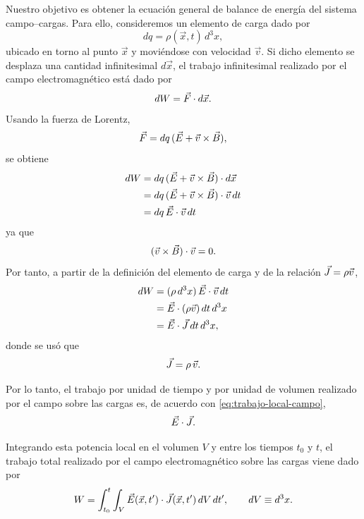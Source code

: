 \documentclass[../main.tex]{subfiles}
\begin{document}
Nuestro objetivo es obtener la ecuación general de balance de energía del sistema campo--cargas. Para ello, consideremos un elemento de carga dado por
\begin{equation*}
    dq=\rho(\vec x,t)\,d^3x,
\end{equation*}
ubicado en torno al punto $\vec x$ y moviéndose con velocidad $\vec v$. Si dicho elemento se desplaza una cantidad infinitesimal $d\vec x$, el trabajo infinitesimal realizado por el campo electromagnético está dado por
\begin{equation*}
    dW=\vec{F}\cdot d\vec x.
\end{equation*}
Usando la fuerza de Lorentz,
\begin{equation*}
    \vec{F}=dq\,(\vec{E}+\vec v\times\vec{B}),
\end{equation*}
se obtiene
\begin{align*}
    dW
    &=dq\,(\vec{E}+\vec v\times\vec{B})\cdot d\vec x \notag\\
    &=dq\,(\vec{E}+\vec v\times\vec{B})\cdot \vec v\,dt \notag\\
    &=dq\,\vec{E}\cdot \vec v\,dt
\end{align*}
ya que
\begin{equation*}
    (\vec v\times\vec{B})\cdot \vec v=0.
\end{equation*}
Por tanto, a partir de la definición del elemento de carga y de la relación $\vec{J}=\rho\vec v$,
\begin{align}
    dW
    &= (\rho\,d^3x)\,\vec{E}\cdot\vec v\,dt \notag\\
    &= \vec{E}\cdot(\rho\vec v)\,dt\,d^3x \notag\\
    &= \vec{E}\cdot\vec{J}\,dt\,d^3x,
    \label{eq:trabajo-local-campo}
\end{align}
donde se usó que
\begin{equation*}
    \vec{J}=\rho\,\vec v.
\end{equation*}

Por lo tanto, el trabajo por unidad de tiempo y por unidad de volumen realizado por el campo sobre las cargas es, de acuerdo con \eqref{eq:trabajo-local-campo},
\begin{equation*}
    \vec{E}\cdot\vec{J}.
\end{equation*}

Integrando esta potencia local en el volumen $V$ y entre los tiempos $t_0$ y $t$, el trabajo total realizado por el campo electromagnético sobre las cargas viene dado por
\begin{equation*}
    W=\int_{t_0}^{t}\int_V \vec{E}(\vec x,t')\cdot\vec{J}(\vec x,t')\,dV\,dt',
    \qquad dV\equiv d^3x.
\end{equation*}
\end{document}
